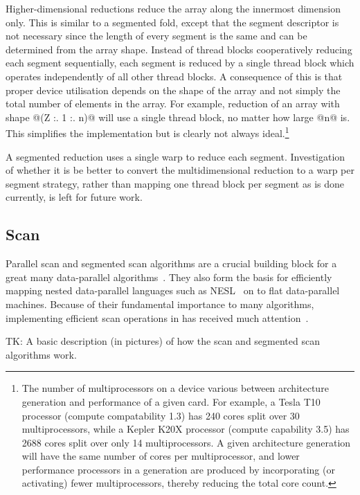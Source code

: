 Higher-dimensional reductions reduce the array along the innermost dimension
only. This is similar to a segmented fold, except that the segment descriptor is
not necessary since the length of every segment is the same and can be
determined from the array shape. Instead of thread blocks cooperatively reducing
each segment sequentially, each segment is reduced by a single thread block
which operates independently of all other thread blocks. A consequence of this
is that proper device utilisation depends on the shape of the array and not
simply the total number of elements in the array. For example, reduction of an
array with shape @(Z :. 1 :. n)@ will use a single thread block, no matter
how large @n@ is. This simplifies the implementation but is clearly not
always ideal.\footnote{The number of multiprocessors on a device various between
architecture generation and performance of a given card. For example, a Tesla
T10 processor (compute compatability 1.3) has 240 cores split over 30
multiprocessors, while a Kepler K20X processor (compute capability 3.5) has 2688
cores split over only 14 multiprocessors. A given architecture generation will
have the same number of cores per multiprocessor, and lower performance
processors in a generation are produced by incorporating (or activating) fewer
multiprocessors, thereby reducing the total core count.}

A segmented reduction uses a single warp to reduce each segment. Investigation
of whether it is be better to convert the multidimensional reduction to a warp
per segment strategy, rather than mapping one thread block per segment as is
done currently, is left for future work.


\subsection{Scan}

Parallel scan and segmented scan algorithms are a crucial building block for a
great many data-parallel algorithms~\cite{Blelloch:1990ts,Chatterjee:1990vj}.
They also form the basis for efficiently mapping nested data-parallel languages
such as NESL~\cite{Blelloch:1995ut,Blelloch:1996jx} on to flat data-parallel
machines. Because of their fundamental importance to many algorithms,
implementing efficient scan operations in \CUDA has received much
attention~\cite{Sengupta:2007tc,Dotsenko:2008fo,Harris:2012fy}.

TK: A basic description (in pictures) of how the scan and segmented scan
algorithms work.


